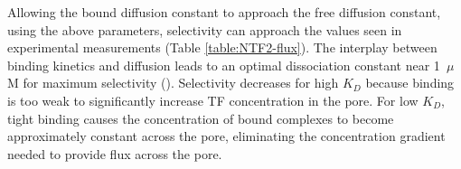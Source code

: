 Allowing the bound diffusion constant to approach the free diffusion constant, using the above parameters, selectivity can approach the values seen in experimental measurements (Table \ref{table:NTF2-flux}).  The interplay between binding kinetics and diffusion leads to an optimal dissociation constant near 1~$\mu$M for maximum selectivity (). Selectivity decreases for high $K_D$ because binding is too weak to
significantly increase TF concentration in the pore.  For low $K_D$, tight binding causes the concentration of bound complexes to become approximately constant across the pore, eliminating the concentration gradient needed to provide flux across the pore.




